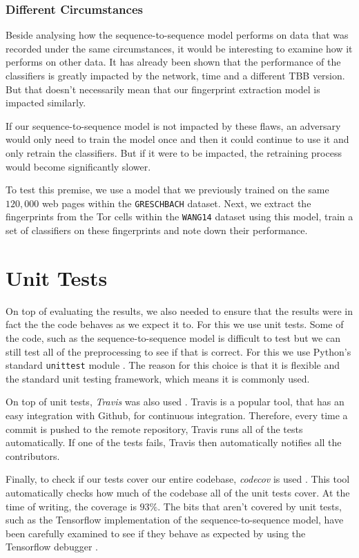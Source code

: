 \subsubsection{Different Circumstances}

Beside analysing how the sequence-to-sequence model performs on data that was recorded under the same circumstances, it would be interesting to examine how it performs on other data.
It has already been shown that the performance of the classifiers is greatly impacted by the network, time and a different TBB version.
But that doesn't necessarily mean that our fingerprint extraction model is impacted similarly.

If our sequence-to-sequence model is not impacted by these flaws, an adversary would only need to train the model once and then it could continue to use it and only retrain the classifiers.
But if it were to be impacted, the retraining process would become significantly slower.

To test this premise, we use a model that we previously trained on the same $120,000$ web pages within the \texttt{GRESCHBACH} dataset.
Next, we extract the fingerprints from the Tor cells within the \texttt{WANG14} dataset using this model, train a set of classifiers on these fingerprints and note down their performance.




\section{Unit Tests}

On top of evaluating the results, we also needed to ensure that the results were in fact the the code behaves as we expect it to.
For this we use unit tests.
Some of the code, such as the sequence-to-sequence model is difficult to test but we can still test all of the preprocessing to see if that is correct.
For this we use Python's standard \texttt{unittest} module \cite{python_unittest_documentation}.
The reason for this choice is that it is flexible and the standard unit testing framework, which means it is commonly used.

On top of unit tests, \textit{Travis} was also used \cite{travis}.
Travis is a popular tool, that has an easy integration with Github, for continuous integration.
Therefore, every time a commit is pushed to the remote repository, Travis runs all of the tests automatically.
If one of the tests fails, Travis then automatically notifies all the contributors.

Finally, to check if our tests cover our entire codebase, \textit{codecov} is used \cite{codecov}.
This tool automatically checks how much of the codebase all of the unit tests cover.
At the time of writing, the coverage is $93\%$.
The bits that aren't covered by unit tests, such as the Tensorflow implementation of the sequence-to-sequence model, have been carefully examined to see if they behave as expected by using the Tensorflow debugger \cite{tensorflow}.
